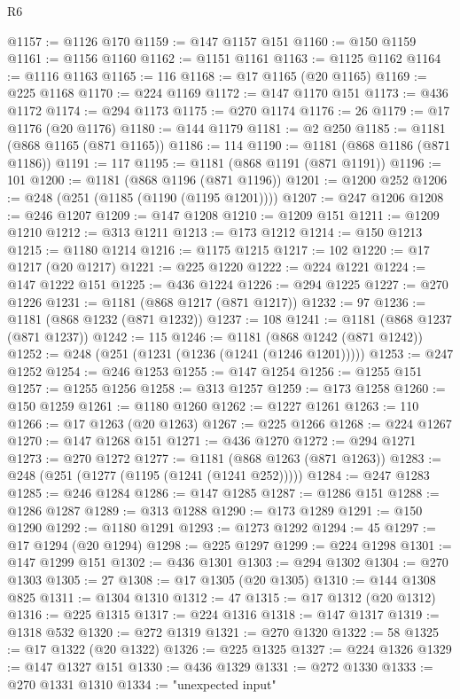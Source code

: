 \begin{lexlean}{R6}
\begin{coremodule}
@1157 := @1126 @170
@1159 := @147 @1157 @151
@1160 := @150 @1159
@1161 := @1156 @1160
@1162 := @1151 @1161
@1163 := @1125 @1162
@1164 := @1116 @1163
@1165 := 116
@1168 := @17 @1165 (@20 @1165)
@1169 := @225 @1168
@1170 := @224 @1169
@1172 := @147 @1170 @151
@1173 := @436 @1172
@1174 := @294 @1173
@1175 := @270 @1174
@1176 := 26
@1179 := @17 @1176 (@20 @1176)
@1180 := @144 @1179
@1181 := @2 @250
@1185 := @1181 (@868 @1165 (@871 @1165))
@1186 := 114
@1190 := @1181 (@868 @1186 (@871 @1186))
@1191 := 117
@1195 := @1181 (@868 @1191 (@871 @1191))
@1196 := 101
@1200 := @1181 (@868 @1196 (@871 @1196))
@1201 := @1200 @252
@1206 := @248 (@251 (@1185 (@1190 (@1195 @1201))))
@1207 := @247 @1206
@1208 := @246 @1207
@1209 := @147 @1208
@1210 := @1209 @151
@1211 := @1209 @1210
@1212 := @313 @1211
@1213 := @173 @1212
@1214 := @150 @1213
@1215 := @1180 @1214
@1216 := @1175 @1215
@1217 := 102
@1220 := @17 @1217 (@20 @1217)
@1221 := @225 @1220
@1222 := @224 @1221
@1224 := @147 @1222 @151
@1225 := @436 @1224
@1226 := @294 @1225
@1227 := @270 @1226
@1231 := @1181 (@868 @1217 (@871 @1217))
@1232 := 97
@1236 := @1181 (@868 @1232 (@871 @1232))
@1237 := 108
@1241 := @1181 (@868 @1237 (@871 @1237))
@1242 := 115
@1246 := @1181 (@868 @1242 (@871 @1242))
@1252 := @248 (@251 (@1231 (@1236 (@1241 (@1246 @1201)))))
@1253 := @247 @1252
@1254 := @246 @1253
@1255 := @147 @1254
@1256 := @1255 @151
@1257 := @1255 @1256
@1258 := @313 @1257
@1259 := @173 @1258
@1260 := @150 @1259
@1261 := @1180 @1260
@1262 := @1227 @1261
@1263 := 110
@1266 := @17 @1263 (@20 @1263)
@1267 := @225 @1266
@1268 := @224 @1267
@1270 := @147 @1268 @151
@1271 := @436 @1270
@1272 := @294 @1271
@1273 := @270 @1272
@1277 := @1181 (@868 @1263 (@871 @1263))
@1283 := @248 (@251 (@1277 (@1195 (@1241 (@1241 @252)))))
@1284 := @247 @1283
@1285 := @246 @1284
@1286 := @147 @1285
@1287 := @1286 @151
@1288 := @1286 @1287
@1289 := @313 @1288
@1290 := @173 @1289
@1291 := @150 @1290
@1292 := @1180 @1291
@1293 := @1273 @1292
@1294 := 45
@1297 := @17 @1294 (@20 @1294)
@1298 := @225 @1297
@1299 := @224 @1298
@1301 := @147 @1299 @151
@1302 := @436 @1301
@1303 := @294 @1302
@1304 := @270 @1303
@1305 := 27
@1308 := @17 @1305 (@20 @1305)
@1310 := @144 @1308 @825
@1311 := @1304 @1310
@1312 := 47
@1315 := @17 @1312 (@20 @1312)
@1316 := @225 @1315
@1317 := @224 @1316
@1318 := @147 @1317
@1319 := @1318 @532
@1320 := @272 @1319
@1321 := @270 @1320
@1322 := 58
@1325 := @17 @1322 (@20 @1322)
@1326 := @225 @1325
@1327 := @224 @1326
@1329 := @147 @1327 @151
@1330 := @436 @1329
@1331 := @272 @1330
@1333 := @270 @1331 @1310
@1334 := "unexpected input"

\end{coremodule}
\end{lexlean}
